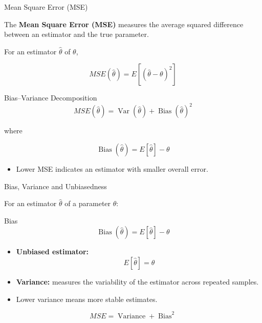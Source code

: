 \documentclass{beamer}
\begin{document}

\begin{frame}{Mean Square Error (MSE)}

The \textbf{Mean Square Error (MSE)} measures the average
squared difference between an estimator and the true parameter.

For an estimator $\hat{\theta}$ of $\theta$,

\[
\boxed{
MSE(\hat{\theta})
=
E\left[(\hat{\theta}-\theta)^2\right]
}
\]

\begin{block}{Bias--Variance Decomposition}
\[
\boxed{
MSE(\hat{\theta})
=
\operatorname{Var}(\hat{\theta})
+
\operatorname{Bias}(\hat{\theta})^2
}
\]

where

\[
\operatorname{Bias}(\hat{\theta})
=
E[\hat{\theta}]-\theta
\]
\end{block}

\begin{itemize}
    \item Lower MSE indicates an estimator with smaller overall error.
\end{itemize}

\end{frame}


\begin{frame}{Bias, Variance and Unbiasedness}

For an estimator $\hat{\theta}$ of a parameter $\theta$:

\begin{block}{Bias}
\[
\boxed{
\operatorname{Bias}(\hat{\theta})
=
E[\hat{\theta}]-\theta
}
\]
\end{block}

\begin{itemize}
    \item \textbf{Unbiased estimator:}
    \[
    E[\hat{\theta}]=\theta
    \]
    \item \textbf{Variance:} measures the variability of the estimator
          across repeated samples.
    \item Lower variance means more stable estimates.
\end{itemize}

\[
\boxed{
MSE=\operatorname{Variance}+\operatorname{Bias}^2
}
\]

\end{frame}
\end{document}
